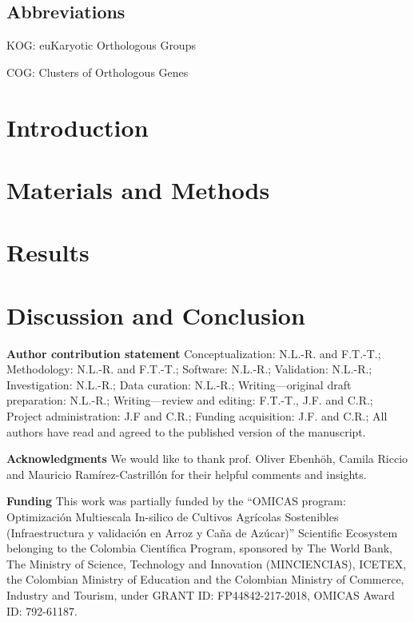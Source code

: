 \documentclass[referee,pdflatex,sn-basic]{sn-jnl}%
\theoremstyle{thmstyleone}%
\theoremstyle{thmstyletwo}%
\theoremstyle{thmstylethree}%
\begin{document}
\subsection*{Abbreviations}

KOG: euKaryotic Orthologous Groups

COG: Clusters of Orthologous Genes



\section{Introduction}
\label{sec:intro}



\section{Materials and Methods}
\label{sec:method}



\section{Results}
\label{sec:results}



\section{Discussion and Conclusion}
\label{sec:conclusion}







\backmatter

\vspace{1in}

\textbf{Author contribution statement} Conceptualization: N.L.-R. and 
F.T.-T.; Methodology: N.L.-R. and F.T.-T.; Software: N.L.-R.; 
Validation: N.L.-R.; Investigation: N.L.-R.; 
Data curation: N.L.-R.; 
Writing---original draft preparation: N.L.-R.; 
Writing---review and editing: F.T.-T., J.F. and C.R.; 
Project administration: J.F and C.R.; 
Funding acquisition: J.F. and C.R.;
All authors have read and agreed to the published version of the 
manuscript.

\textbf{Acknowledgments}
We would like to thank prof. Oliver Ebenhöh, Camila Riccio and 
Mauricio Ramírez-Castrillón for their helpful comments and 
insights.

\textbf{Funding}
This work was partially funded by the ``OMICAS program:
Optimización Multiescala In-silico de Cultivos Agrícolas 
Sostenibles (Infraestructura y validación en Arroz y Caña de 
Azúcar)'' Scientific Ecosystem belonging to the Colombia 
Científica Program, sponsored by The World Bank, The 
Ministry of Science, Technology and Innovation (MINCIENCIAS), 
ICETEX, the Colombian Ministry of Education and the Colombian 
Ministry of Commerce, Industry and Tourism, under GRANT ID: 
FP44842-217-2018, OMICAS Award ID: 792-61187.
\end{document}
